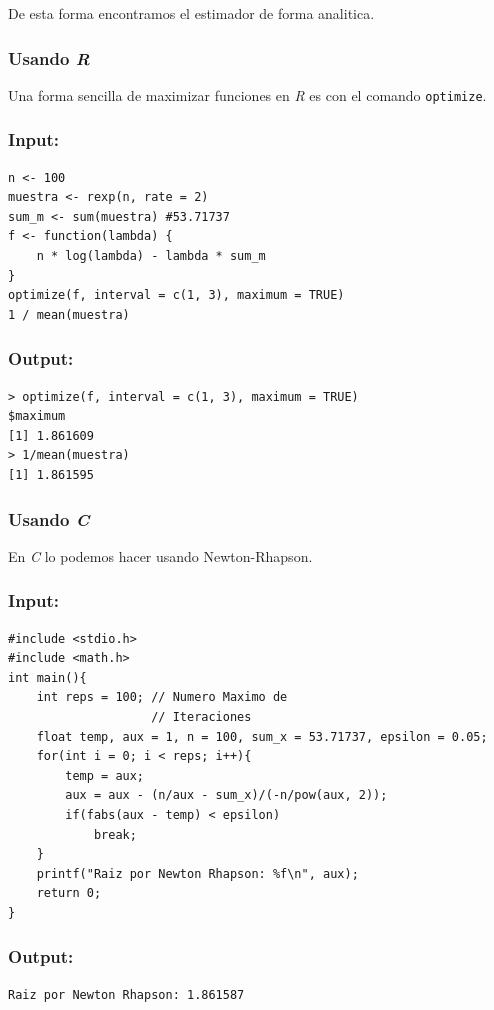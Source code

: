 \documentclass{article}
\begin{document}
    De esta forma encontramos el estimador de forma analitica.

    \subsubsection{Usando \textit{R}}
    Una forma sencilla de maximizar funciones en \textit{R} es con el comando \verb|optimize|.
    
    \subsubsection*{Input:}
    \begin{verbatim}
n <- 100
muestra <- rexp(n, rate = 2)
sum_m <- sum(muestra) #53.71737
f <- function(lambda) {
    n * log(lambda) - lambda * sum_m
}
optimize(f, interval = c(1, 3), maximum = TRUE)
1 / mean(muestra)\end{verbatim}
    
    \subsubsection*{Output:}
    \begin{verbatim}
> optimize(f, interval = c(1, 3), maximum = TRUE)
$maximum
[1] 1.861609
> 1/mean(muestra)
[1] 1.861595\end{verbatim}
    
    \subsubsection{Usando \textit{C}}
    En \textit{C} lo podemos hacer usando Newton-Rhapson.

    \subsubsection*{Input:}
    \begin{verbatim}
#include <stdio.h>
#include <math.h>
int main(){
    int reps = 100; // Numero Maximo de
                    // Iteraciones
    float temp, aux = 1, n = 100, sum_x = 53.71737, epsilon = 0.05;
    for(int i = 0; i < reps; i++){
        temp = aux;
        aux = aux - (n/aux - sum_x)/(-n/pow(aux, 2));
        if(fabs(aux - temp) < epsilon)
            break;
    }
    printf("Raiz por Newton Rhapson: %f\n", aux);
    return 0;
}\end{verbatim}

    \subsubsection*{Output:}
    \begin{verbatim}
Raiz por Newton Rhapson: 1.861587\end{verbatim}
\end{document}
